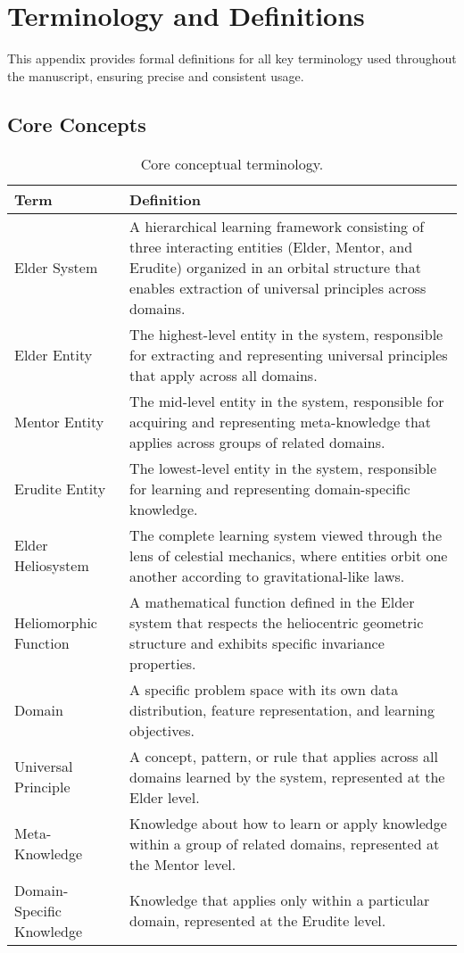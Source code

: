 \chapter{Terminology and Definitions}

This appendix provides formal definitions for all key terminology used throughout the manuscript, ensuring precise and consistent usage.

\section{Core Concepts}

\begin{table}[h]
\centering
\begin{tabular}{|l|p{12cm}|}
\hline
\textbf{Term} & \textbf{Definition} \\
\hline
Elder System & A hierarchical learning framework consisting of three interacting entities (Elder, Mentor, and Erudite) organized in an orbital structure that enables extraction of universal principles across domains. \\
\hline
Elder Entity & The highest-level entity in the system, responsible for extracting and representing universal principles that apply across all domains. \\
\hline
Mentor Entity & The mid-level entity in the system, responsible for acquiring and representing meta-knowledge that applies across groups of related domains. \\
\hline
Erudite Entity & The lowest-level entity in the system, responsible for learning and representing domain-specific knowledge. \\
\hline
Elder Heliosystem & The complete learning system viewed through the lens of celestial mechanics, where entities orbit one another according to gravitational-like laws. \\
\hline
Heliomorphic Function & A mathematical function defined in the Elder system that respects the heliocentric geometric structure and exhibits specific invariance properties. \\
\hline
Domain & A specific problem space with its own data distribution, feature representation, and learning objectives. \\
\hline
Universal Principle & A concept, pattern, or rule that applies across all domains learned by the system, represented at the Elder level. \\
\hline
Meta-Knowledge & Knowledge about how to learn or apply knowledge within a group of related domains, represented at the Mentor level. \\
\hline
Domain-Specific Knowledge & Knowledge that applies only within a particular domain, represented at the Erudite level. \\
\hline
\end{tabular}
\caption{Core conceptual terminology.}
\label{tab:core_terminology}
\end{table}

